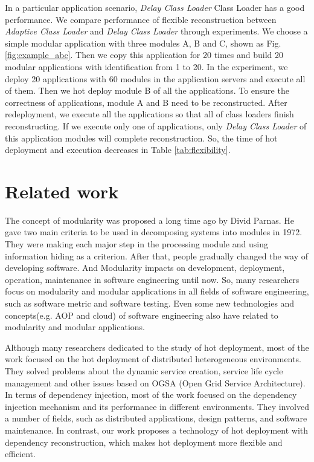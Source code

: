 \documentclass[conference]{IEEEtran}
\begin{document}
In a particular application scenario, \emph{Delay Class Loader} Class Loader has a good performance. 
We compare performance of flexible reconstruction between \emph{Adaptive Class Loader} and \emph{Delay Class Loader} through experiments.
We choose a simple modular application with three modules A, B and C, shown as Fig. \ref{fig:example_abc}.
Then we copy this application for 20 times and build 20 modular applications with identification from 1 to 20.
In the experiment, we deploy 20 applications with 60 modules in the application servers and execute all of them.
Then we hot deploy module B of all the applications.
To ensure the correctness of applications, module A and B need to be reconstructed.
After redeployment, we execute all the applications so that all of class loaders finish reconstructing.
If we execute only one of applications, only \emph{Delay Class Loader} of this application modules will complete reconstruction.
So, the time of hot deployment and execution decreases in Table \ref{tab:flexibility}. 



\section{Related work\label{sec:relatedwork}}

The concept of modularity was proposed a long time ago by Divid Parnas\cite{Divid_specification}.
He gave two main criteria\cite{Divid_criteria} to be used in decomposing systems into modules in 1972.
They were making each major step in the processing module and using information hiding as a criterion.
After that, people gradually changed the way of developing software.
And Modularity impacts on development, deployment, operation, maintenance in software engineering until now.
So, many researchers focus on modularity and modular applications in all fields of software engineering, such as software metric\cite{module_metric} and software testing\cite{module_test}.
Even some new technologies and concepts(e.g. AOP\cite{module_aop} and cloud\cite{module_cloud}) of software engineering also have related to modularity and modular applications.

Although many researchers dedicated to the study of hot deployment, most of the work focused on the hot deployment of distributed heterogeneous environments\cite{related_hot_1, related_hot_2, related_hot_3, related_hot_4}.
They solved problems about the dynamic service creation, service life cycle management and other issues based on OGSA (Open Grid Service Architecture).
In terms of dependency injection, most of the work focused on the dependency injection mechanism and its performance in different environments\cite{related_DI_1, related_DI_2, related_DI_3}.
They involved a number of fields, such as distributed applications, design patterns, and software maintenance.
In contrast, our work proposes a technology of hot deployment with dependency reconstruction, which makes hot deployment more flexible and efficient.
\end{document}
